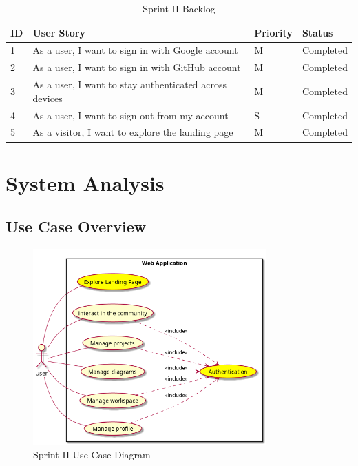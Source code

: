 \begin{table}[H]
\centering
\caption{Sprint II Backlog}
\begin{tabular}{|p{1cm}|p{7cm}|p{2cm}|p{2cm}|}
\hline
\textbf{ID} & \textbf{User Story} & \textbf{Priority} & \textbf{Status} \\
\hline
1 & As a user, I want to sign in with Google account & M & Completed \\
\hline
2 & As a user, I want to sign in with GitHub account & M & Completed \\
\hline
3 & As a user, I want to stay authenticated across devices & M & Completed \\
\hline
4 & As a user, I want to sign out from my account & S & Completed \\
\hline
5 & As a visitor, I want to explore the landing page & M & Completed \\
\hline
\end{tabular}
\end{table}
\section{System Analysis}

\subsection{Use Case Overview}
\begin{figure}[H]
    \centering
    \includegraphics[width=0.8\textwidth]{conception/SprintII/use_case_diagrams/use_case_diagram_of_SprintII.png}
    \caption{Sprint II Use Case Diagram}
    \label{fig:usecase_sprint2}
\end{figure}
\newpage
